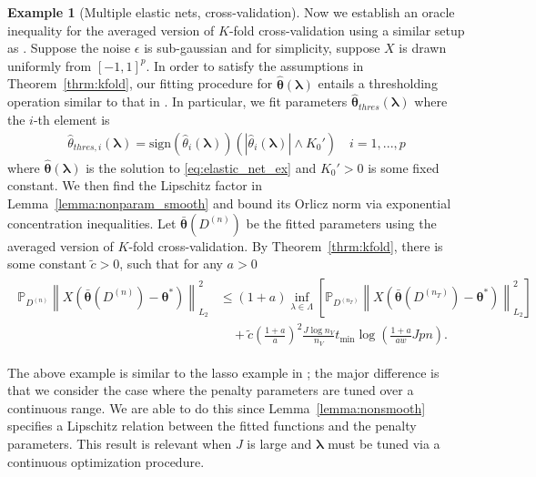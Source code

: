 \documentclass[12pt]{article} %
\theoremstyle{definition}
\newtheorem{example}{Example}
\begin{document}
\begin{example}[Multiple elastic nets, cross-validation]
	\label{eq:elastic_net_cv}
	Now we establish an oracle inequality for the averaged version of $K$-fold cross-validation using a similar setup as \citet{lecue2012oracle}.
	Suppose the noise $\epsilon$ is sub-gaussian and for simplicity, suppose $X$ is drawn uniformly from $[-1, 1]^p$.
	In order to satisfy the assumptions in Theorem~\ref{thrm:kfold}, our fitting procedure for $\hat{\boldsymbol{\theta}}(\boldsymbol{\lambda})$ entails a thresholding operation similar to that in \citet{lecue2012oracle}.
	In particular, we fit parameters $\hat{\boldsymbol{\theta}}_{thres}(\boldsymbol{\lambda})$ where the $i$-th element is
	\begin{align}
	\hat{{\theta}}_{thres, i}(\boldsymbol{\lambda})
	= \text{sign}(\hat{{\theta}}_{i}(\boldsymbol{\lambda}))
	(|\hat{{\theta}}_{i}(\boldsymbol{\lambda})| \wedge K_0')
	\quad i = 1,...,p
	\label{eq:threshold_elastic_net}
	\end{align}
	where $\hat{\boldsymbol{\theta}}(\boldsymbol{\lambda})$ is the solution to \eqref{eq:elastic_net_ex} and $K_0' > 0$ is some fixed constant.
	We then find the Lipschitz factor in Lemma~\ref{lemma:nonparam_smooth} and bound its Orlicz norm via exponential concentration inequalities.
	Let $\bar{\boldsymbol{\theta}}(D^{(n)})$ be the fitted parameters using the averaged version of $K$-fold cross-validation.
	By Theorem~\ref{thrm:kfold}, there is some constant $\tilde{c} > 0$, such that for any $a > 0$
	\begin{align}
	\begin{split}
	\mathbb{P}_{D^{(n)}}
	\left \|
	X \left(
	\bar{\boldsymbol{\theta}}(D^{(n)})
	- \boldsymbol{\theta}^*
	\right)
	\right \|_{L_{2}}^{2}
	& \le	(1+a)
	\inf_{\lambda\in\Lambda}
	\left[
	\mathbb{P}_{D^{(n_{T})}}
	\left \|
	X \left(
	\bar{\boldsymbol{\theta}}(D^{(n_T)})
	- \boldsymbol{\theta}^*
	\right)
	\right \|_{L_{2}}^{2}
	\right] \\
	& \quad +
	\tilde{c}
	\left (\frac{1+a}{a} \right )^2
	\frac{J \log n_{V}}{n_{V}}
	t_{\min}
	\log\left(
	\frac{1+a}{aw} Jpn
	\right).
	\end{split}
	\end{align}

\noindent The above example is similar to the lasso example in \citet{lecue2012oracle}; the major difference is that we consider the case where the penalty parameters are tuned over a continuous range.
We are able to do this since Lemma~\ref{lemma:nonsmooth} specifies a Lipschitz relation between the fitted functions and the penalty parameters.
This result is relevant when $J$ is large and $\boldsymbol{\lambda}$ must be tuned via a continuous optimization procedure.
\end{example}
\end{document}
